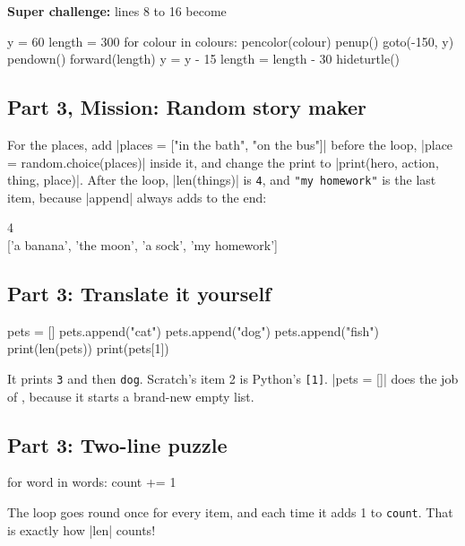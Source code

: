 \textbf{Super challenge:} lines 8 to 16 become
\begin{codenonum}
y = 60
length = 300
for colour in colours:
    pencolor(colour)
    penup()
    goto(-150, y)
    pendown()
    forward(length)
    y = y - 15
    length = length - 30
hideturtle()
\end{codenonum}

\subsection*{Part 3, Mission: Random story maker}
For the places, add \py|places = ["in the bath", "on the bus"]| before the loop, \py|place = random.choice(places)| inside it, and change the print to \py|print(hero, action, thing, place)|. After the loop, \py|len(things)| is \texttt{4}, and \texttt{"my homework"} is the last item, because \py|append| always adds to the end:
\begin{outputbox}
4\\
{[}'a banana', 'the moon', 'a sock', 'my homework']
\end{outputbox}

\subsection*{Part 3: Translate it yourself}
\begin{codenonum}
pets = []
pets.append("cat")
pets.append("dog")
pets.append("fish")
print(len(pets))
print(pets[1])
\end{codenonum}
It prints \texttt{3} and then \texttt{dog}. Scratch's item 2 is Python's \texttt{[1]}. \py|pets = []| does the job of , because it starts a brand-new empty list.

\subsection*{Part 3: Two-line puzzle}
\begin{codenonum}
for word in words:
    count += 1
\end{codenonum}
The loop goes round once for every item, and each time it adds 1 to \texttt{count}. That is exactly how \py|len| counts!
